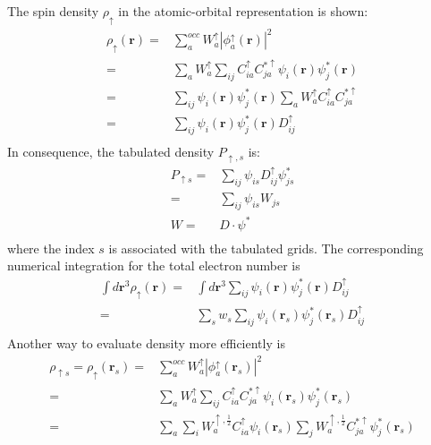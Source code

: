 \documentclass[a4paper,12pt]{article}
\begin{document}
The spin density $\rho_{\uparrow}$ in the atomic-orbital representation is shown:
\begin{equation}
	\begin{split}
		\rho_{\uparrow}(\textbf{r}) = &\sum_{a}^{occ}W_{a}^{\uparrow}|\phi_a^{\uparrow}(\textbf{r})|^2\\
		= &\sum_{a}W_{a}^{\uparrow}\sum_{ij}C_{ia}^{\uparrow}C_{ja}^{*\uparrow}\psi_i(\textbf{r})\psi_j^*(\textbf{r})\\
		= &\sum_{ij}\psi_i(\textbf{r})\psi_j^*(\textbf{r})\sum_{a}W_{a}^{\uparrow}C_{ia}^{\uparrow}C_{ja}^{*\uparrow}\\
		= &\sum_{ij}\psi_i(\textbf{r})\psi_j^*(\textbf{r})D_{ij}^{\uparrow}\\
	\end{split}
\end{equation}
In consequence, the tabulated density $P_{\uparrow,s}$ is:
\begin{equation}
	\begin{split}
		P_{\uparrow s} = &\sum_{ij}\psi_{is}D_{ij}^{\uparrow}\psi_{js}^{*}\\
		= &\sum_{ij}\psi_{is}W_{js}\\
		W = &D\cdot \psi^*\\
	\end{split}
\end{equation}
where the index $s$ is associated with the tabulated grids. The corresponding numerical integration for the total electron number is
\begin{equation}
	\begin{split}
		\int d\textbf{r}^3 \rho_{\uparrow}(\textbf{r}) = &\int d\textbf{r}^3\sum_{ij}\psi_i(\textbf{r})\psi_j^*(\textbf{r})D_{ij}^{\uparrow}\\
		= &\sum_{s}w_s\sum_{ij}\psi_i(\textbf{r}_s)\psi_j^*(\textbf{r}_s)D_{ij}^{\uparrow}\\
	\end{split}
\end{equation}
Another way to evaluate density more efficiently is
\begin{equation}
	\begin{split}
		\rho_{\uparrow s}=\rho_{\uparrow}(\textbf{r}_s) = &\sum_{a}^{occ}W_{a}^{\uparrow}|\phi_a^{\uparrow}(\textbf{r}_s)|^2\\
		= &\sum_{a}W_{a}^{\uparrow}\sum_{ij}C_{ia}^{\uparrow}C_{ja}^{*\uparrow}\psi_i(\textbf{r}_s)\psi_j^*(\textbf{r}_s)\\
		= &\sum_{a}\sum_{i}W_{a}^{\uparrow,\frac{1}{2}}C_{ia}^{\uparrow}\psi_i(\textbf{r}_s)
	    	\sum_{j}W_{a}^{\uparrow,\frac{1}{2}}C_{ja}^{*\uparrow}\psi_j^*(\textbf{r}_s)\\
	\end{split}
\end{equation}
\end{document}
